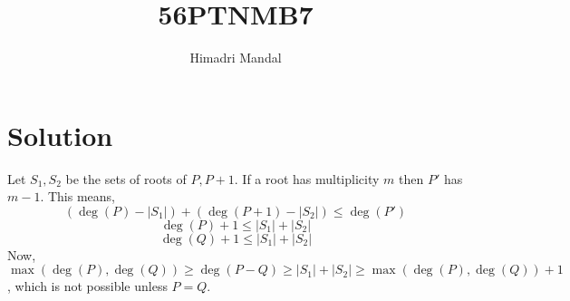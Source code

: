 \documentclass[11pt]{scrartcl}
\title{56PTNMB7}
\author{Himadri Mandal}
\begin{document}
\maketitle

\section{Solution}
\begin{soln}
  Let $S_1,S_2$ be the sets of roots of $P, P+1$. If a root has multiplicity $m$ then $P'$ has $m-1$.
  This means, 
  \[ (\deg(P) - |S_1|) + (\deg(P+1) - |S_2|) \leq \deg(P') \]
  \[ \deg(P) + 1 \leq  |S_1| + |S_2| \]
  \[\deg(Q) + 1 \leq |S_1| + |S_2|\]
  Now, $\max(\deg(P),\deg(Q)) \geq \deg(P-Q) \geq |S_1| + |S_2| \geq \max(\deg(P),\deg(Q)) + 1$, which is not possible unless $P=Q$.
\end{soln}
\end{document}
